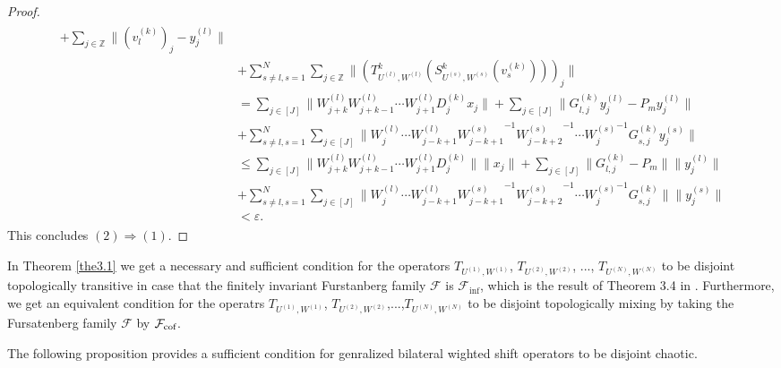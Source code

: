 \documentclass{article}
\begin{document}
\begin{proof}
\begin{eqnarray}
\begin{split}
	+\sum_{j\in\mathbb{Z}}\|(v^{(k)}_{l})_{j}-y^{(l)}_{j}\| 
	\\
	& +\sum^{N}_{s\neq l, s=1} \sum_{j\in\mathbb{Z}} \|(T^{k}_{U^{(l)},W^{(l)}}(S^{k}_{U^{(s)},W^{(s)}}(v^{(k)}_{s})))_{j}\|
	\\
	&=\sum_{j\in[J]}\|W^{(l)}_{j+k}W^{(l)}_{j+k-1}\cdots W^{(l)}_{j+1}D^{(k)}_{j}x_{j}\|+\sum_{j\in[J]}\|G^{(k)}_{l,j}y^{(l)}_{j}-P_{m}y^{(l)}_{j}\|
	\\
	& +\sum^{N}_{s\neq l, s=1} \sum_{j\in[J]} \|W^{(l)}_{j}\cdots W^{(l)}_{j-k+1}{W^{(s)}_{j-k+1}}^{-1}{W^{(s)}_{j-k+2}}^{-1}\cdots
	{W^{(s)}_{j}}^{-1} G^{(k)}_{s,j}y^{(s)}_{j}\|
	\\
	&\leq \sum_{j\in[J]}\|W^{(l)}_{j+k}W^{(l)}_{j+k-1}\cdots W^{(l)}_{j+1}D^{(k)}_{j}\|\|x_{j}\|+\sum_{j\in[J]}\|G^{(k)}_{l,j}-P_{m}\| \|y^{(l)}_{j}\|
	\\
	& +\sum^{N}_{s\neq l, s=1}\sum_{j\in[J]}\|W^{(l)}_{j}\cdots W^{(l)}_{j-k+1}{W^{(s)}_{j-k+1}}^{-1}{W^{(s)}_{j-k+2}}^{-1}\cdots
	{W^{(s)}_{j}}^{-1}G^{(k)}_{s,j}\|\|y^{(s)}_{j}\|
	\\
	&<\varepsilon.
	\end{split}
	\end{eqnarray}
	This concludes $(2)\Rightarrow(1)$.
\end{proof}

In Theorem \ref{the3.1} we get a necessary and sufficient condition for the operators $T_{U^{(1)},W^{(1)}}$, $T_{U^{(2)},W^{(2)}}$, ..., $T_{U^{(N)},W^{(N)}}$ to be disjoint topologically transitive in case that the finitely invariant Furstanberg family $\mathcal{F}$ is $\mathcal{F}_{\inf}$, which is the result of Theorem 3.4 in \cite{RJ26}. Furthermore, we get an equivalent condition for the operatrs $T_{U^{(1)},W^{(1)}}$, $T_{U^{(2)},W^{(2)}}$,...,$T_{U^{(N)},W^{(N)}}$ to be disjoint topologically mixing by taking the Fursatenberg family $\mathcal{F}$ by $\mathcal{F}_{\textnormal{cof}}$.  

The following proposition provides a sufficient condition for genralized bilateral wighted shift operators to be disjoint chaotic.
\end{document}
